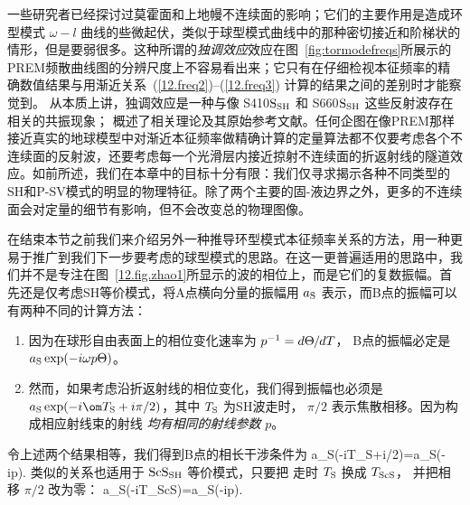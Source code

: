 一些研究者已经探讨过莫霍面和上地幔不连续面的影响；它们的主要作用是造成环型模式 $\omega\!-\!l$ 曲线的些微起伏，类似于球型模式曲线中的那种密切接近和阶梯状的情形，但是要弱很多。这种所谓的{\em 独调效应\/}效应在图~\ref{fig:tormodefreqs}所展示的PREM频散曲线图的分辨尺度上不容易看出来；它只有在仔细检视本征频率的精确数值结果与用渐近关系~(\ref{12.freq2})--(\ref{12.freq3}) 计算的结果之间的差别时才能察觉到。
%
从本质上讲，独调效应是一种与像 S{\scriptsize 410}${\rm S}_{\rm SH}$
和 S{\scriptsize 660}${\rm S}_{\rm SH}$ 这些反射波存在相关的共振现象；
\textcite{lapwood&usami81}概述了相关理论及其原始参考文献。任何企图在像PREM那样接近真实的地球模型中对渐近本征频率做精确计算的定量算法都不仅要考虑各个不连续面的反射波，还要考虑每一个光滑层内接近掠射不连续面的折返射线的隧道效应。如前所述，我们在本章中的目标十分有限：我们仅寻求揭示各种不同类型的SH和P-SV模式的明显的物理特征。除了两个主要的固-液边界之外，更多的不连续面会对定量的细节有影响，但不会改变总的物理图像。

在结束本节之前我们来介绍另外一种推导环型模式本征频率关系的方法，用一种更易于推广到我们下一步要考虑的球型模式的思路。在这一更普遍适用的思路中，我们并不是专注在图~\ref{12.fig.zhao1}所显示的波的相位上，而是它们的复数振幅。首先还是仅考虑SH等价模式，将A点横向分量的振幅用 $a_{\rm S}$ 表示，而B点的振幅可以有两种不同的计算方法：
\begin{enumerate}
\item 因为在球形自由表面上的相位变化速率为
$p^{-1}=d\Theta\hspace{-0.2 mm}/\hspace{-0.2 mm}dT$，
B点的振幅必定是 $a_{\rm S}\exp(-i\omega p\Theta)$。
\item
然而，如果考虑沿折返射线的相位变化，我们得到振幅也必须是
$a_{\rm S}\exp(-i\om T_{\rm S}+i\pi/2)$，其中 $T_{\rm S}$
为SH波走时，
%
$\pi/2$ 表示焦散相移。因为构成相应射线束的射线
{\em 均有相同的射线参数\/} $p$。
\end{enumerate}
令上述两个结果相等，我们得到B点的相长干涉条件为
\eq \label{12.sanscarr1}
a_{\rm S}\exp(-i\om T_{\rm S}+i\pi/2)=a_{\rm S}\exp(-i\omega p\Theta).
\en
类似的关系也适用于 ${\rm ScS}_{\rm SH}$ 等价模式，只要把
走时 $ T_{\rm S}$ 换成 $T_{\rm ScS}$，
并把相移 $\pi/2$ 改为零：
\eq \label{12.sanscarr2}
a_{\rm S}\exp(-i\om T_{\rm ScS})=a_{\rm S}\exp(-i\omega p\Theta).
\en


